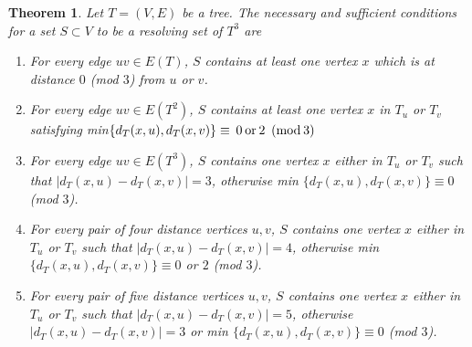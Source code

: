 \documentclass{article}
\newtheorem{thm}{Theorem}[section]
\theoremstyle{definition}
\numberwithin{equation}{section}
\begin{document}
\begin{thm}\label{neccsuff}
Let $T=(V,E)$ be a tree. The necessary and sufficient conditions for a set $S\subset V$
to be a resolving set of $T^{3}$ are

\begin{enumerate}

\item For every edge $uv\in E(T)$, $S$ contains at least one vertex $x$ which is at distance $0$ (mod $3$) from $u$ or $v$.

\item For every edge $uv\in E(T^{2})$, $S$ contains at least one vertex $x$ in $T_{u}$ or $T_{v}$ satisfying min$\{d_{T}(x,u),d_{T}(x,v)\}\equiv \hspace{0.2em} 0 \hspace{0.2em} \mbox{or} \hspace{0.2em}2$  $(\mbox{mod} \hspace{0.2em} 3)$


\item For every edge $uv\in E(T^{3})$, $S$ contains one vertex $x$ either in $T_{u}$ or $T_{v}$ such that $|d_{T}(x,u)-d_{T}(x,v)|=3$, otherwise min $\{d_{T}(x,u),d_{T}(x,v)\}\equiv 0$ (mod $3$).

\item For every pair of four distance vertices $u,v$, $S$ contains one vertex $x$ either in $T_{u}$ or $T_{v}$ such that $|d_{T}(x,u)-d_{T}(x,v)|=4$, otherwise min $\{d_{T}(x,u),d_{T}(x,v)\}\equiv 0$ or $2$ (mod $3$).

\item For every pair of five distance vertices $u,v$,  $S$ contains one vertex $x$ either in $T_{u}$ or $T_{v}$ such that $|d_{T}(x,u)-d_{T}(x,v)|=5 $, otherwise $|d_{T}(x,u)-d_{T}(x,v)|=3$ or min $\{d_{T}(x,u),d_{T}(x,v)\}\equiv 0$ (mod $3$).

\end{enumerate} 
\end{thm}
\end{document}
